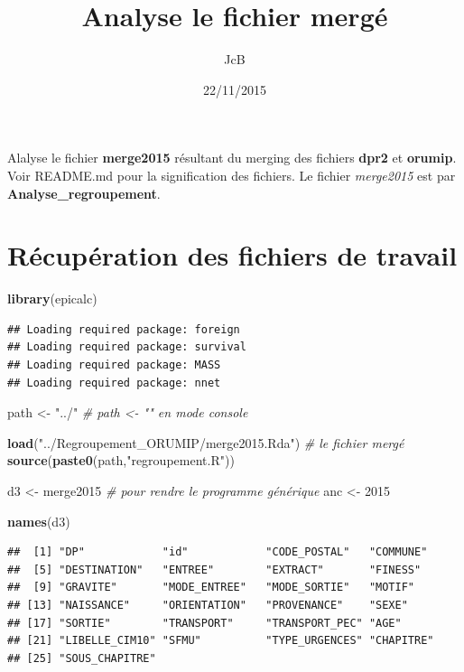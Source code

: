 \documentclass[]{article}
\title{Analyse le fichier mergé}
\author{JcB}
\date{22/11/2015}
\newenvironment{Shaded}{\begin{snugshade}}{\end{snugshade}}
\newcommand{\KeywordTok}[1]{\textcolor[rgb]{0.13,0.29,0.53}{\textbf{{#1}}}}
\newcommand{\DecValTok}[1]{\textcolor[rgb]{0.00,0.00,0.81}{{#1}}}
\newcommand{\StringTok}[1]{\textcolor[rgb]{0.31,0.60,0.02}{{#1}}}
\newcommand{\CommentTok}[1]{\textcolor[rgb]{0.56,0.35,0.01}{\textit{{#1}}}}
\newcommand{\NormalTok}[1]{{#1}}
\begin{document}
\maketitle


{
\hypersetup{linkcolor=black}
\setcounter{tocdepth}{2}
\tableofcontents
}
Alalyse le fichier \textbf{merge2015} résultant du merging des fichiers
\textbf{dpr2} et \textbf{orumip}. Voir README.md pour la signification
des fichiers. Le fichier \emph{merge2015} est par
\textbf{Analyse\_regroupement}.

\section{Récupération des fichiers de
travail}\label{recuperation-des-fichiers-de-travail}

\begin{Shaded}
\begin{Highlighting}[]
\KeywordTok{library}\NormalTok{(epicalc)}
\end{Highlighting}
\end{Shaded}

\begin{verbatim}
## Loading required package: foreign
## Loading required package: survival
## Loading required package: MASS
## Loading required package: nnet
\end{verbatim}

\begin{Shaded}
\begin{Highlighting}[]
\NormalTok{path <-}\StringTok{ "../"} \CommentTok{# path <- "" en mode console}

\KeywordTok{load}\NormalTok{(}\StringTok{"../Regroupement_ORUMIP/merge2015.Rda"}\NormalTok{) }\CommentTok{# le fichier mergé}
\KeywordTok{source}\NormalTok{(}\KeywordTok{paste0}\NormalTok{(path,}\StringTok{"regroupement.R"}\NormalTok{))}

\NormalTok{d3 <-}\StringTok{ }\NormalTok{merge2015 }\CommentTok{# pour rendre le programme générique}
\NormalTok{anc <-}\StringTok{ }\DecValTok{2015}

\KeywordTok{names}\NormalTok{(d3)}
\end{Highlighting}
\end{Shaded}

\begin{verbatim}
##  [1] "DP"            "id"            "CODE_POSTAL"   "COMMUNE"      
##  [5] "DESTINATION"   "ENTREE"        "EXTRACT"       "FINESS"       
##  [9] "GRAVITE"       "MODE_ENTREE"   "MODE_SORTIE"   "MOTIF"        
## [13] "NAISSANCE"     "ORIENTATION"   "PROVENANCE"    "SEXE"         
## [17] "SORTIE"        "TRANSPORT"     "TRANSPORT_PEC" "AGE"          
## [21] "LIBELLE_CIM10" "SFMU"          "TYPE_URGENCES" "CHAPITRE"     
## [25] "SOUS_CHAPITRE"
\end{verbatim}
\end{document}
